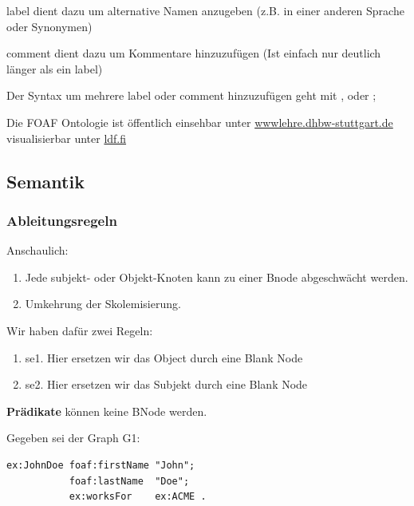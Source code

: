 \documentclass[a4paper]{article}
\begin{document}
label dient dazu um alternative Namen anzugeben (z.B. in einer anderen Sprache oder Synonymen)

comment dient dazu um Kommentare hinzuzufügen (Ist einfach nur deutlich länger als ein label)

Der Syntax um mehrere label oder comment hinzuzufügen geht mit , oder ;

Die FOAF Ontologie ist öffentlich einsehbar unter \href{https://wwwlehre.dhbw-stuttgart.de/~hladik/SW/Ontologien/foaf.ttl}{wwwlehre.dhbw-stuttgart.de} visualisierbar unter \href{http://www.ldf.fi/service/rdf-grapher}{ldf.fi}



\subsection{Semantik}



\subsubsection{Ableitungsregeln}

Anschaulich:

\begin{enumerate}
    \item Jede subjekt- oder Objekt-Knoten kann zu einer Bnode abgeschwächt werden.
    \item Umkehrung der Skolemisierung.
\end{enumerate}

Wir haben dafür zwei Regeln:

\begin{enumerate}
    \item se1. Hier ersetzen wir das Object durch eine Blank Node
    \item se2. Hier ersetzen wir das Subjekt durch eine Blank Node
\end{enumerate}

\textbf{Prädikate} können keine BNode werden.


Gegeben sei der Graph G1:

\begin{lstlisting}
ex:JohnDoe foaf:firstName "John";
           foaf:lastName  "Doe";
           ex:worksFor    ex:ACME .
\end{lstlisting}
\end{document}
